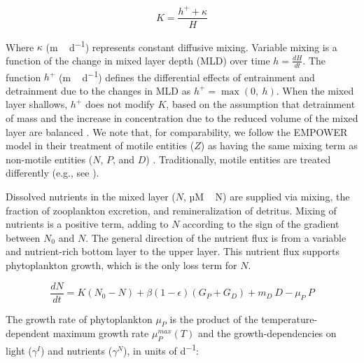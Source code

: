 \documentclass[gmd, manuscript]{copernicus}
\begin{document}
\begin{equation}
    K = \frac{h^{+} + \kappa}{H}
\end{equation}

Where $\kappa$ (\unit{m\,d^{−1}}) represents constant diffusive mixing. Variable mixing is a function of the change in mixed layer depth (MLD) over time $h = \frac{dH}{dt}$. The function $h^{+}$ (\unit{m\,d^{−1}}) defines the differential effects of entrainment and detrainment due to the changes in MLD as $h^{+} = \max(0, \ h)$. When the mixed layer shallows, $h^{+}$ does not modify $K$, based on the assumption that detrainment of mass and the increase in concentration due to the reduced volume of the mixed layer are balanced \citep{Evans1985ACycles}. We note that, for comparability, we follow the EMPOWER model in their treatment of motile entities ($Z$) as having the same mixing term as non-motile entities ($N$, $P$, and $D$) \citep{Anderson2015c}. Traditionally, motile entities are treated differently (e.g., see \citet{Fasham1990a}).

Dissolved nutrients in the mixed layer ($N$, \unit{µM\,N}) are supplied via mixing, the fraction of zooplankton excretion, and remineralization of detritus. Mixing of nutrients is a positive term, adding to $N$ according to the sign of the gradient between $N_0$ and $N$. The general direction of the nutrient flux is from a variable and nutrient-rich bottom layer to the upper layer. This nutrient flux supports phytoplankton growth, which is the only loss term for $N$.

\begin{equation}
    \label{Eq:EmpowerNuts}
    \frac{d N}{d t} = 
    K (N_0 - N) %
    + \beta(1 - \epsilon)(G_P + G_D) %
    + m_D \ D %
    - \mu_{P} \ P %
\end{equation}

The growth rate of phytoplankton $\mu_{P}$ is the product of the temperature-dependent maximum growth rate $\mu_P^{max}(T)$ and the growth-dependencies on light ($\gamma^{I}$) and nutrients ($\gamma^{N}$), in units of \unit{d^{−1}}: 
\end{document}
